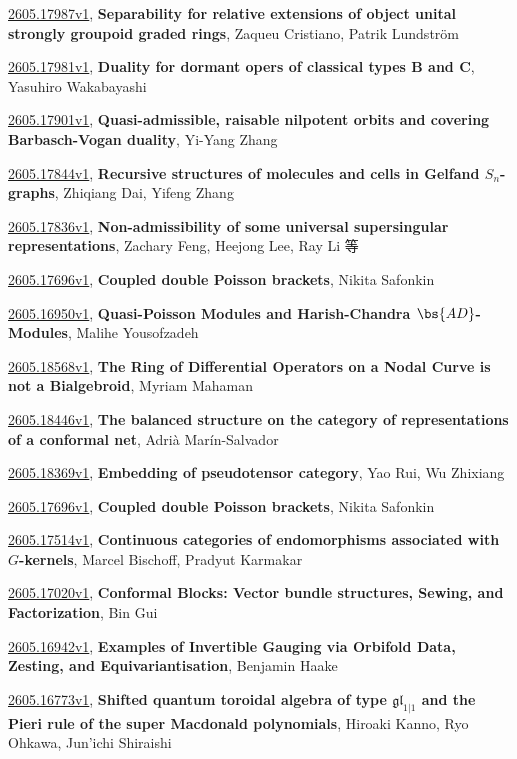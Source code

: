 \documentclass[9pt, a4paper]{article}
\theoremstyle{plain}
\theoremstyle{definition}
\theoremstyle{remark}
\newcommand{\arxiv}[3]{\href{https://arxiv.org/abs/#1}{#1}, \textbf{\textcolor{arxivblue}{#2}}, #3}
\begin{document}
\arxiv{2605.17987v1}{Separability for relative extensions of object unital strongly groupoid graded rings}{Zaqueu Cristiano, Patrik Lundström}

\arxiv{2605.17981v1}{Duality for dormant opers of classical types B and C}{Yasuhiro Wakabayashi}

\arxiv{2605.17901v1}{Quasi-admissible, raisable nilpotent orbits and covering Barbasch-Vogan duality}{Yi-Yang Zhang}

\arxiv{2605.17844v1}{Recursive structures of molecules and cells in Gelfand $S_n$-graphs}{Zhiqiang Dai, Yifeng Zhang}

\arxiv{2605.17836v1}{Non-admissibility of some universal supersingular representations}{Zachary Feng, Heejong Lee, Ray Li 等}

\arxiv{2605.17696v1}{Coupled double Poisson brackets}{Nikita Safonkin}

\arxiv{2605.16950v1}{Quasi-Poisson Modules and Harish-Chandra $\bs{AD}$-Modules}{Malihe Yousofzadeh}

\arxiv{2605.18568v1}{The Ring of Differential Operators on a Nodal Curve is not a Bialgebroid}{Myriam Mahaman}

\arxiv{2605.18446v1}{The balanced structure on the category of representations of a conformal net}{Adrià Marín-Salvador}

\arxiv{2605.18369v1}{Embedding of pseudotensor category}{Yao Rui, Wu Zhixiang}

\arxiv{2605.17696v1}{Coupled double Poisson brackets}{Nikita Safonkin}

\arxiv{2605.17514v1}{Continuous categories of endomorphisms associated with $G$-kernels}{Marcel Bischoff, Pradyut Karmakar}

\arxiv{2605.17020v1}{Conformal Blocks: Vector bundle structures, Sewing, and Factorization}{Bin Gui}

\arxiv{2605.16942v1}{Examples of Invertible Gauging via Orbifold Data, Zesting, and Equivariantisation}{Benjamin Haake}

\arxiv{2605.16773v1}{Shifted quantum toroidal algebra of type $\mathfrak{gl}_{1|1}$ and the Pieri rule of the super Macdonald polynomials}{Hiroaki Kanno, Ryo Ohkawa, Jun'ichi Shiraishi}

\end{document}
